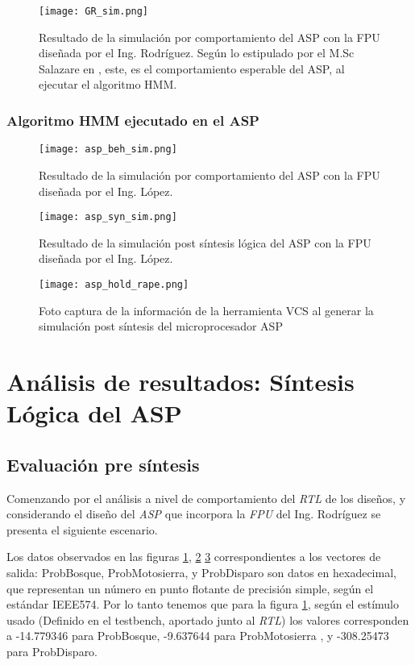\begin{figure}[ht]
\texttt{[image: GR\_sim.png]}
\centering
\caption{Resultado de la simulación por comportamiento del ASP con la FPU diseñada por el Ing. Rodríguez. Según lo estipulado por el M.Sc Salazare en \cite{Carlosthesis}, este, es el comportamiento esperable del ASP, al ejecutar el algoritmo HMM.}
\label{fig:gr_sim}
\end{figure}

\subsubsection{Algoritmo HMM ejecutado en el ASP}
\begin{figure}[ht]
\texttt{[image: asp\_beh\_sim.png]}
\centering
\caption{Resultado de la simulación por comportamiento del ASP con la FPU diseñada por el Ing. López.}
\label{fig:asp_beh_sim}
\end{figure}

\begin{figure}[ht]
\texttt{[image: asp\_syn\_sim.png]}
\centering
\caption{Resultado de la simulación post síntesis lógica del ASP con la FPU diseñada por el Ing. López.}
\label{fig:asp_syn_sim}
\end{figure}

\begin{figure}[ht]
\texttt{[image: asp\_hold\_rape.png]}
\caption{Foto captura de la información de la herramienta VCS al generar la simulación post síntesis del microprocesador ASP}
\label{fig_asp_hold}
\end{figure}

\section{Análisis de resultados: Síntesis Lógica del ASP}

\subsection{Evaluación pre síntesis}

Comenzando por el análisis a nivel de comportamiento del \textit{RTL} de los diseños, y considerando el diseño del \textit{ASP} que incorpora la \textit{FPU} del Ing. Rodríguez se presenta el siguiente escenario.

Los datos observados en las figuras \ref{fig:gr_sim}, \ref{fig:asp_beh_sim} \ref{fig:asp_syn_sim} correspondientes a los vectores de salida: ProbBosque, ProbMotosierra, y ProbDisparo son datos en hexadecimal, que representan un número en punto flotante de precisión simple, según el estándar IEEE574. Por lo tanto tenemos que para la figura \ref{fig:gr_sim}, según el estímulo usado (Definido en el testbench, aportado junto al \textit{RTL}) los valores corresponden a -14.779346 para ProbBosque, -9.637644 para ProbMotosierra , y -308.25473 para ProbDisparo.

